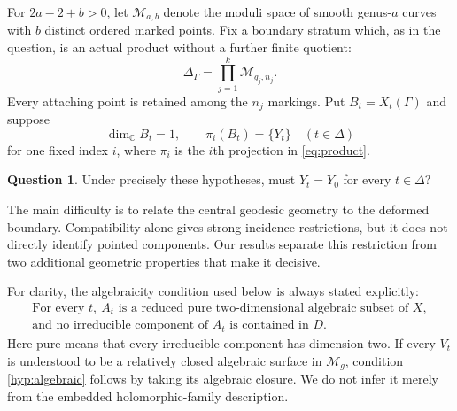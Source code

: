 \documentclass[11pt]{article}
\newcommand{\M}{\mathcal M}
\newcommand{\C}{\mathbb C}
\theoremstyle{definition}
\newtheorem{question}[theorem]{Question}
\theoremstyle{remark}
\begin{document}
For $2a-2+b>0$, let $\M_{a,b}$ denote the moduli space of smooth genus-$a$ curves with $b$ distinct ordered marked points. Fix a boundary stratum which, as in the question, is an actual product without a further finite quotient:
\begin{equation}\label{eq:product}
 \Delta_\Gamma=\prod_{j=1}^k\M_{g_j,n_j}.
\end{equation}
Every attaching point is retained among the $n_j$ markings. Put $B_t=X_t(\Gamma)$ and suppose
\begin{equation}\label{eq:singleton}
 \dim_{\C}B_t=1,\qquad \pi_i(B_t)=\{Y_t\}
 \quad(t\in\Delta)
\end{equation}
for one fixed index $i$, where $\pi_i$ is the $i$th projection in \eqref{eq:product}.

\begin{question}\label{q:original}
Under precisely these hypotheses, must $Y_t=Y_0$ for every $t\in\Delta$?
\end{question}

The main difficulty is to relate the central geodesic geometry to the deformed boundary. Compatibility alone gives strong incidence restrictions, but it does not directly identify pointed components. Our results separate this restriction from two additional geometric properties that make it decisive.

For clarity, the algebraicity condition used below is always stated explicitly:
\begin{equation}\tag{A}\label{hyp:algebraic}
 \begin{gathered}
 \text{For every }t,\ A_t\text{ is a reduced pure two-dimensional algebraic subset of }X,\\
 \text{and no irreducible component of }A_t\text{ is contained in }D.
 \end{gathered}
\end{equation}
Here pure means that every irreducible component has dimension two. If every $V_t$ is understood to be a relatively closed algebraic surface in $\M_g$, condition \eqref{hyp:algebraic} follows by taking its algebraic closure. We do not infer it merely from the embedded holomorphic-family description.
\end{document}
